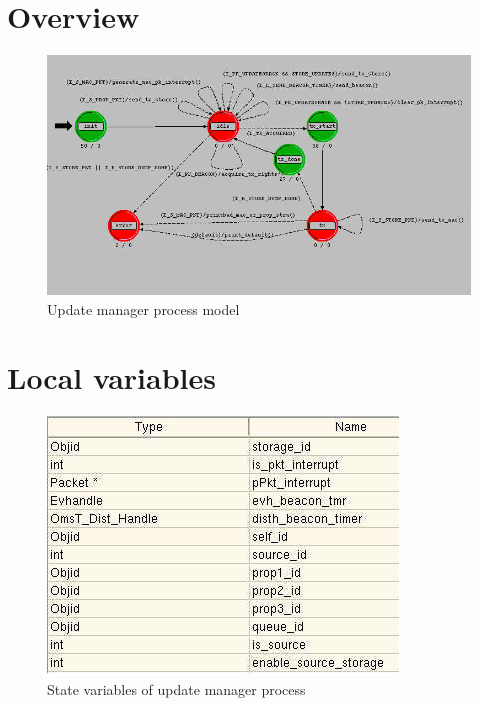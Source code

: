 

\section{Overview}
\begin{figure}[ht]
    \centering
    \includegraphics[scale=0.6]{images/p_update_manager}
    \caption{Update manager process model}
    \label{fig:appendix-c}
\end{figure}

\newpage

\section{Local variables}
\begin{figure}[ht]
    \centering
    \includegraphics[width=.7\textwidth]{images/state_variable_update_manager}
    \caption{State variables of update manager process}
    \label{fig:appendix-c_sv}
\end{figure}

